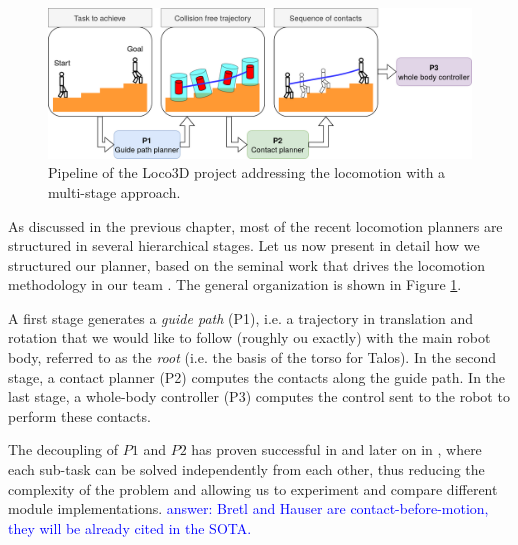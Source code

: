 \begin{figure}
    \centering
    \includegraphics[width=\textwidth]{Figures/Chapter_LEAS/pipeline.png}
    \caption{Pipeline of the Loco3D project addressing the locomotion with a multi-stage approach.}
    \label{fig:pipeline}
\end{figure}


As discussed in the previous chapter, most of the recent locomotion planners are structured in several hierarchical stages. Let us now present in detail how we structured our planner, based on the seminal work that drives the locomotion methodology in our team \cite{loco3d}.
The general organization is shown in Figure \ref{fig:pipeline}.

A first stage generates a \textit{guide path} (P1), i.e. a trajectory in translation and rotation that we would like to follow (roughly ou exactly) with the main robot body, referred to as the \textit{root} (i.e. the basis of the torso for Talos). In the second stage, a contact planner (P2) computes the contacts along the guide path. In the last stage, a whole-body controller (P3) computes the control sent to the robot to perform these contacts.

The decoupling of $P1$ and $P2$ has proven successful in \cite{Escande2008Guide, bouyarmane2009} and later on in \cite{loco3d, RB-PRM}, where each sub-task can be solved independently from each other, thus reducing the complexity of the problem and allowing us to experiment and compare different module implementations. 
\textcolor{blue}{answer: Bretl and Hauser are contact-before-motion, they will be already cited in the SOTA.}

